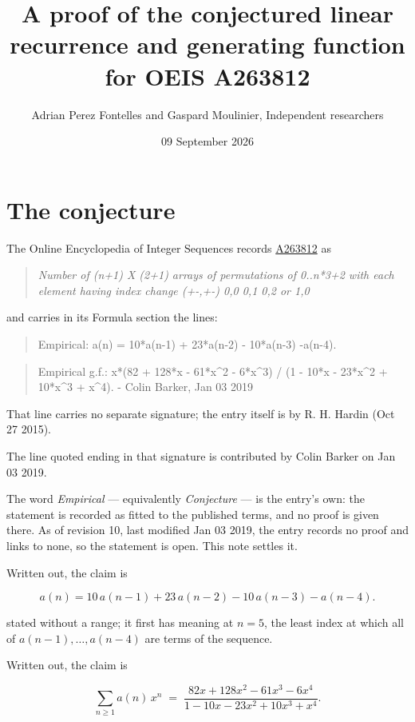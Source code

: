 \documentclass[11pt]{article}
\title{A proof of the conjectured linear recurrence and generating function for OEIS A263812}
\author{Adrian Perez Fontelles and Gaspard Moulinier, Independent researchers}
\date{09 September 2026}
\theoremstyle{definition}
\begin{document}
\maketitle
\section{The conjecture}

The Online Encyclopedia of Integer Sequences records \href{https://oeis.org/A263812}{A263812} as

\begin{quote}\itshape Number of (n+1) X (2+1) arrays of permutations of 0..n*3+2 with each element having index change (+-,+-) 0,0 0,1 0,2 or 1,0\end{quote}

and carries in its Formula section the lines:

\begin{quote}\ttfamily Empirical: a(n) = 10*a(n-1) + 23*a(n-2) - 10*a(n-3) -a(n-4).\end{quote}

\begin{quote}\ttfamily Empirical g.f.: x*(82 + 128*x - 61*x\textasciicircum{}2 - 6*x\textasciicircum{}3) / (1 - 10*x - 23*x\textasciicircum{}2 + 10*x\textasciicircum{}3 + x\textasciicircum{}4). - Colin Barker, Jan 03 2019\end{quote}

That line carries no separate signature; the entry itself is by R. H. Hardin (Oct 27 2015).

The line quoted ending in that signature is contributed by Colin Barker on Jan 03 2019.

The word {\itshape Empirical} --- equivalently {\itshape Conjecture} --- is the entry's own: the statement is recorded as fitted to the published terms, and no proof is given there. As of revision 10, last modified Jan 03 2019, the entry records no proof and links to none, so the statement is open. This note settles it.

Written out, the claim is

\[a(n) = 10\,a(n-1) + 23\,a(n-2) - 10\,a(n-3) - a(n-4).\]

stated without a range; it first has meaning at $n = 5$, the least index at which all of $a(n-1),\dots,a(n-4)$ are terms of the sequence.

Written out, the claim is

\[\sum_{n \ge 1} a(n)\,x^n \;=\; \frac{82x + 128x^{2} - 61x^{3} - 6x^{4}}{1 - 10x - 23x^{2} + 10x^{3} + x^{4}}.\]
\end{document}
